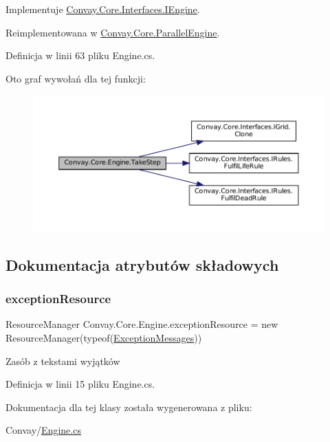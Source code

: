 Implementuje \hyperlink{interface_convay_1_1_core_1_1_interfaces_1_1_i_engine_a58f031ed5f145506e9dd1e6067c683a5}{Convay.\+Core.\+Interfaces.\+I\+Engine}.



Reimplementowana w \hyperlink{class_convay_1_1_core_1_1_parallel_engine_a32e4a4911dcbb74f555b99944940d921}{Convay.\+Core.\+Parallel\+Engine}.



Definicja w linii 63 pliku Engine.\+cs.

Oto graf wywołań dla tej funkcji\+:
\nopagebreak
\begin{figure}[H]
\begin{center}
\leavevmode
\includegraphics[width=350pt]{class_convay_1_1_core_1_1_engine_a02713f5cb5242a65d2e1816512e0b791_cgraph}
\end{center}
\end{figure}


\subsection{Dokumentacja atrybutów składowych}
\hypertarget{class_convay_1_1_core_1_1_engine_a42e18f3b5a92a0de8957dc23010ca822}{}\label{class_convay_1_1_core_1_1_engine_a42e18f3b5a92a0de8957dc23010ca822} 
\subsubsection{\texorpdfstring{exception\+Resource}{exceptionResource}}
{\footnotesize\ttfamily Resource\+Manager Convay.\+Core.\+Engine.\+exception\+Resource = new Resource\+Manager(typeof(\hyperlink{class_convay_1_1_core_1_1_exception_messages}{Exception\+Messages}))\hspace{0.3cm}{\ttfamily [protected]}}



Zasób z tekstami wyjątków 



Definicja w linii 15 pliku Engine.\+cs.



Dokumentacja dla tej klasy została wygenerowana z pliku\+:\begin{DoxyCompactItemize}
\item 
Convay/\hyperlink{_engine_8cs}{Engine.\+cs}\end{DoxyCompactItemize}
